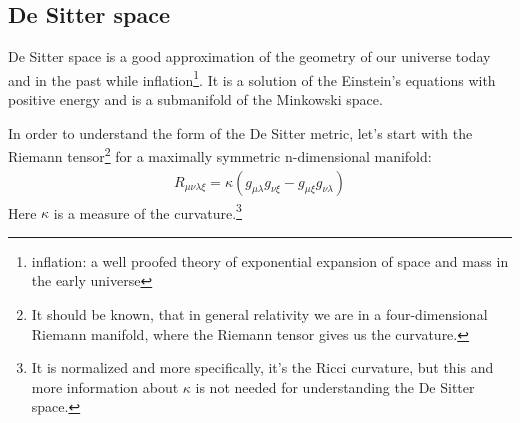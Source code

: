 \subsection{De Sitter space \checkmark} 
	De Sitter space is a good approximation of the geometry of our universe today and in the past while inflation\footnote{inflation: a well proofed theory of exponential expansion of space and mass in the early universe}. It is a solution of the Einstein's equations with positive energy and is a submanifold of the Minkowski space.
	
	
	In order to understand the form of the De Sitter metric, let's start with the Riemann tensor\footnote{It should be known, that in general relativity we are in a four-dimensional Riemann manifold, where the Riemann tensor gives us the curvature.} for a maximally symmetric n-dimensional manifold: 
		\begin{align}
			R_{\mu \nu \lambda \xi} = \kappa (g_{\mu \lambda} g_{\nu \xi} - g_{\mu \xi} g_{\nu \lambda})
		\end{align}
	Here $\kappa$ is a measure of the curvature.\footnote{It is normalized and more specifically, it's the Ricci curvature, but this and more information about $\kappa$ is not needed for understanding the De Sitter space.}
	
